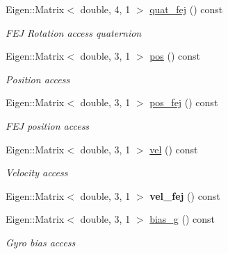 \begin{DoxyCompactItemize}
\mbox{\label{classov__type_1_1IMU_a4bcd57c1285852ba4ece139b12787251}} 
Eigen\+::\+Matrix$<$ double, 4, 1 $>$ \hyperlink{classov__type_1_1IMU_a4bcd57c1285852ba4ece139b12787251}{quat\+\_\+fej} () const
\begin{DoxyCompactList}\small\item\em F\+EJ Rotation access quaternion \end{DoxyCompactList}\item 
\mbox{\label{classov__type_1_1IMU_ada4cc66b7fb6a38944c61b08599cc55f}} 
Eigen\+::\+Matrix$<$ double, 3, 1 $>$ \hyperlink{classov__type_1_1IMU_ada4cc66b7fb6a38944c61b08599cc55f}{pos} () const
\begin{DoxyCompactList}\small\item\em Position access \end{DoxyCompactList}\item 
\mbox{\label{classov__type_1_1IMU_ab6f68955da2f060d286fbc7db99b96e7}} 
Eigen\+::\+Matrix$<$ double, 3, 1 $>$ \hyperlink{classov__type_1_1IMU_ab6f68955da2f060d286fbc7db99b96e7}{pos\+\_\+fej} () const
\begin{DoxyCompactList}\small\item\em F\+EJ position access \end{DoxyCompactList}\item 
\mbox{\label{classov__type_1_1IMU_ab9a75b1353679fd26e18df4b1a92b7fa}} 
Eigen\+::\+Matrix$<$ double, 3, 1 $>$ \hyperlink{classov__type_1_1IMU_ab9a75b1353679fd26e18df4b1a92b7fa}{vel} () const
\begin{DoxyCompactList}\small\item\em Velocity access \end{DoxyCompactList}\item 
\mbox{\label{classov__type_1_1IMU_a7760d3c3298bf0e69256eb168d60592c}} 
Eigen\+::\+Matrix$<$ double, 3, 1 $>$ {\bfseries vel\+\_\+fej} () const
\item 
\mbox{\label{classov__type_1_1IMU_a934683d471f8f24bd526772d3146be0e}} 
Eigen\+::\+Matrix$<$ double, 3, 1 $>$ \hyperlink{classov__type_1_1IMU_a934683d471f8f24bd526772d3146be0e}{bias\+\_\+g} () const
\begin{DoxyCompactList}\small\item\em Gyro bias access \end{DoxyCompactList}\item 

\end{DoxyCompactItemize}
